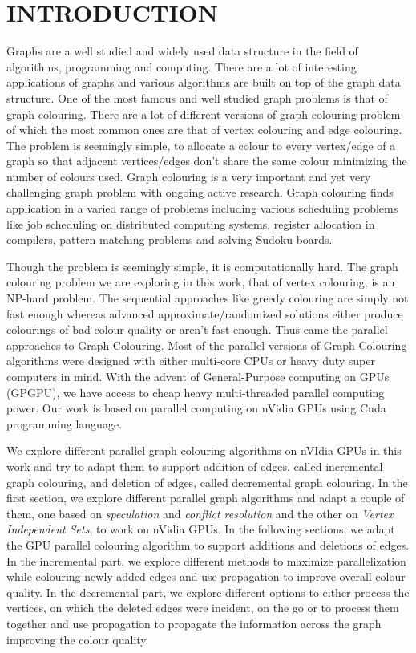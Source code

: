 \documentclass[MTech]{iitmdiss}
\begin{document}




\chapter{INTRODUCTION}
\label{chap:intro}
Graphs are a well studied and widely used data structure in the field of algorithms, programming and computing. There are a lot of interesting applications of graphs and various algorithms are built on top of the graph data structure. One of the most famous and well studied graph problems is that of graph colouring. There are a lot of different versions of graph colouring problem of which the most common ones are that of vertex colouring and edge colouring. The problem is seemingly simple, to allocate a colour to every vertex/edge of a graph so that adjacent vertices/edges don't share the same colour minimizing the number of colours used.  
Graph colouring is a very important and yet very challenging graph problem with ongoing active research. Graph colouring finds application in a varied range of problems including various scheduling problems like job scheduling on distributed computing systems, register allocation in compilers, pattern matching problems and solving Sudoku boards.

Though the problem is seemingly simple, it is computationally hard. The graph colouring problem we are exploring in this work, that of vertex colouring, is an NP-hard problem. The sequential approaches like greedy colouring are simply not fast enough whereas advanced approximate/randomized solutions either produce colourings of bad colour quality or aren't fast enough. Thus came the parallel approaches to Graph Colouring. Most of the parallel versions of Graph Colouring algorithms were designed with either multi-core CPUs or heavy duty super computers in mind. With the advent of General-Purpose computing on GPUs (GPGPU), we have access to cheap heavy multi-threaded parallel computing power. Our work is based on parallel computing on nVidia GPUs using Cuda programming language.

We explore different parallel graph colouring algorithms on nVIdia GPUs in this work and try to adapt them to support addition of edges, called incremental graph colouring, and deletion of edges, called decremental graph colouring. In the first section, we explore different parallel graph algorithms and adapt a couple of them, one based on \textit{speculation} and \textit{conflict resolution} and the other on \textit{Vertex Independent Sets}, to work on nVidia GPUs. In the following sections, we adapt the GPU parallel colouring algorithm to support additions and deletions of edges. In the incremental part, we explore different methods to maximize parallelization while colouring newly added edges and use propagation to improve overall colour quality. In the decremental part, we explore different options to either process the vertices, on which the deleted edges were incident, on the go or to process them together and use propagation to propagate the information across the graph improving the colour quality. 
\end{document}
